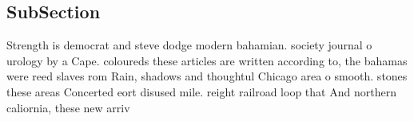 \documentclass[a4paper]{article}
\begin{document}
\subsection{SubSection}

Strength is democrat and steve dodge modern bahamian. society journal o urology by a Cape. coloureds these articles are written according to, the bahamas were reed slaves rom Rain, shadows and thoughtul Chicago area o smooth. stones these areas Concerted eort disused mile. reight railroad loop that And northern caliornia, these new arriv
\end{document}
